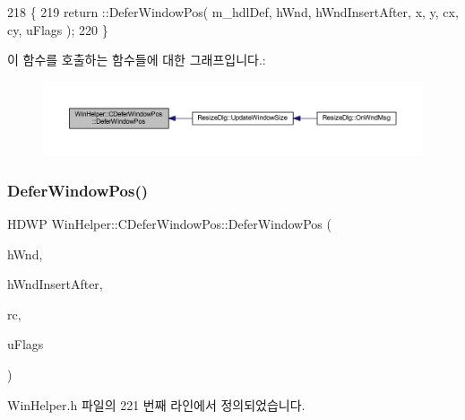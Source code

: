 \begin{DoxyCode}
218         \{
219           return ::DeferWindowPos( m\_hdlDef, hWnd, hWndInsertAfter, x, y, cx, cy, uFlags );
220         \}
\end{DoxyCode}
이 함수를 호출하는 함수들에 대한 그래프입니다.\+:
\nopagebreak
\begin{figure}[H]
\begin{center}
\leavevmode
\includegraphics[width=350pt]{class_win_helper_1_1_c_defer_window_pos_a50e9a5dfc382996381a506d66f94efd6_icgraph}
\end{center}
\end{figure}
\mbox{\label{class_win_helper_1_1_c_defer_window_pos_aeba6047e5182577c14bfe4729a602ca9}} 
\subsubsection{\texorpdfstring{Defer\+Window\+Pos()}{DeferWindowPos()}\hspace{0.1cm}{\footnotesize\ttfamily [2/2]}}
{\footnotesize\ttfamily H\+D\+WP Win\+Helper\+::\+C\+Defer\+Window\+Pos\+::\+Defer\+Window\+Pos (\begin{DoxyParamCaption}\item[{H\+W\+ND}]{h\+Wnd,  }\item[{H\+W\+ND}]{h\+Wnd\+Insert\+After,  }\item[{\mbox{\hyperlink{getopt1_8c_a2c212835823e3c54a8ab6d95c652660e}{const}} \mbox{\hyperlink{class_win_helper_1_1_c_rect}{C\+Rect}} \&}]{rc,  }\item[{U\+I\+NT}]{u\+Flags }\end{DoxyParamCaption})\hspace{0.3cm}{\ttfamily [inline]}}



Win\+Helper.\+h 파일의 221 번째 라인에서 정의되었습니다.


